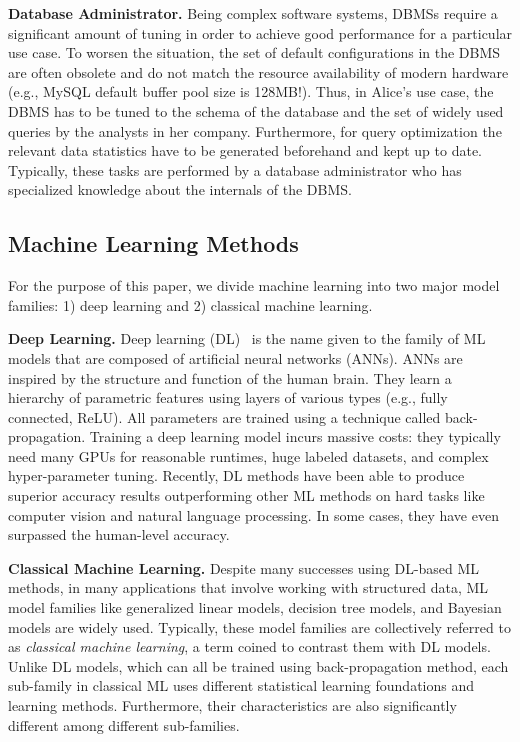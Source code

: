 \vspace{2mm}
\noindent \textbf{Database Administrator.} Being complex software systems, DBMSs require a significant amount of tuning in order to achieve good performance for a particular use case.
To worsen the situation, the set of default configurations in the DBMS are often obsolete and do not match the resource availability of modern hardware (e.g., MySQL default buffer pool size is 128MB!).
Thus, in Alice's use case, the DBMS has to be tuned to the schema of the database and the set of widely used queries by the analysts in her company.
Furthermore, for query optimization the relevant data statistics have to be generated beforehand and kept up to date.
Typically, these tasks are performed by a database administrator who has specialized knowledge about the internals of the DBMS.


\subsection{Machine Learning Methods}
For the purpose of this paper, we divide machine learning into two major model families: 1) deep learning and 2) classical machine learning.

\vspace{2mm}
\noindent \textbf{Deep Learning. } Deep learning (DL)~\cite{dlbook} is the name given to the family of ML models that are composed of artificial neural networks (ANNs).
ANNs are inspired by the structure and function of the human brain.
They learn a hierarchy of parametric features using layers of various types (e.g., fully connected, ReLU).
All parameters are trained using a technique called back-propagation.
Training a deep learning model incurs massive costs: they typically need many GPUs for reasonable runtimes, huge labeled datasets, and complex hyper-parameter tuning.
Recently, DL methods have been able to produce superior accuracy results outperforming other ML methods on hard tasks like computer vision and natural language processing.
In some cases, they have even surpassed the human-level accuracy.

\vspace{2mm}
\noindent \textbf{Classical Machine Learning. } Despite many successes using DL-based ML methods, in many applications that involve working with structured data, ML model families like generalized linear models, decision tree models, and Bayesian models are widely used.
Typically, these model families are collectively referred to as \textit{classical machine learning}, a term coined to contrast them with DL models.
Unlike DL models, which can all be trained using back-propagation method, each sub-family in classical ML uses different statistical learning foundations and learning methods.
Furthermore, their characteristics are also significantly different among different sub-families.

